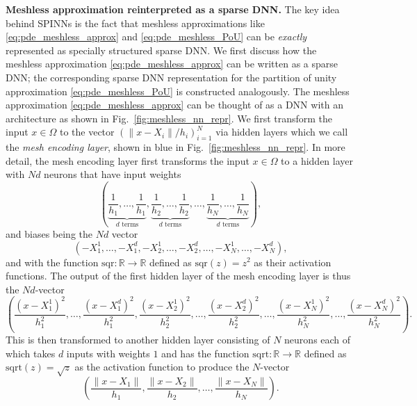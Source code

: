 \documentclass[12pt]{article}
\begin{document}
\textbf{Meshless approximation reinterpreted as a sparse DNN.} The key idea behind SPINNs is the fact that meshless approximations like \eqref{eq:pde_meshless_approx} and \eqref{eq:pde_meshless_PoU} can be \emph{exactly} represented as specially structured sparse DNN. We first discuss how the meshless approximation \eqref{eq:pde_meshless_approx} can be written as a sparse DNN; the corresponding sparse DNN representation for the partition of unity approximation \eqref{eq:pde_meshless_PoU} is constructed analogously. The meshless approximation \eqref{eq:pde_meshless_approx} can be thought of as a DNN with an architecture as shown in Fig.~\ref{fig:meshless_nn_repr}.  We first transform the input  $x \in \Omega$ to the vector $(\lVert x - X_i\rVert/h_i)_{i=1}^N$ via hidden layers which we call the \emph{mesh encoding layer}, shown in blue in Fig.~\ref{fig:meshless_nn_repr}. In more detail, the mesh encoding layer first transforms the input $x \in \Omega$ to a hidden layer with $Nd$ neurons that have input weights
\begin{displaymath}
\left(\underbrace{\frac{1}{h_1}, \ldots, \frac{1}{h_1}}_{\text{$d$ terms}}, \underbrace{\frac{1}{h_2}, \ldots, \frac{1}{h_2}}_{\text{$d$ terms}}, \ldots, \underbrace{\frac{1}{h_N}, \ldots, \frac{1}{h_N}}_{\text{$d$ terms}} \right),
\end{displaymath}
and biases being the $Nd$ vector
\begin{displaymath}
(-X_1^1, \ldots, -X_1^d, -X_2^1, \ldots, -X_2^d, \ldots, -X_N^1, \ldots, -X_N^d),
\end{displaymath}
and with the function $\text{sqr}:\mathbb{R} \to \mathbb{R}$ defined as $\text{sqr}(z) = z^2$ as their activation functions. The output of the first hidden layer of the mesh encoding layer is thus the $Nd$-vector
\begin{displaymath}
\left(\frac{(x - X_1^1)^2}{h_1^2}, \ldots, \frac{(x - X_1^d)^2}{h_1^2}, \frac{(x - X_2^1)^2}{h_2^2}, \ldots, \frac{(x - X_2^d)^2}{h_2^2}, \ldots, \frac{(x - X_N^1)^2}{h_N^2}, \ldots, \frac{(x - X_N^d)^2}{h_N^2}\right).
\end{displaymath}
This is then transformed to another hidden layer consisting of $N$ neurons each of which takes $d$ inputs with weights $1$ and has the function $\text{sqrt}:\mathbb{R} \to \mathbb{R}$ defined as $\text{sqrt}(z) = \sqrt{z}$ as the activation function to produce the $N$-vector
\begin{displaymath}
\left(\frac{\lVert x - X_1\rVert}{h_1}, \frac{\lVert x - X_2\rVert}{h_2}, \ldots, \frac{\lVert x - X_N\rVert}{h_N}\right).
\end{displaymath}
\end{document}
